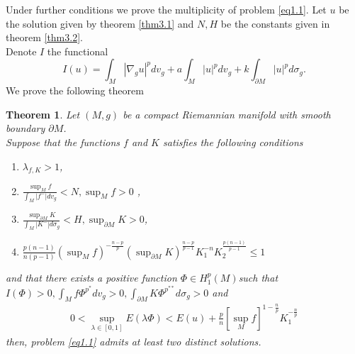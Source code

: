 \documentclass{Tran-l}
\newtheorem{thm}{Theorem}[section]
\theoremstyle{definition}
\theoremstyle{remark}
\numberwithin{equation}{section}
\begin{document}
Under further conditions we prove the multiplicity of problem
\eqref{eq1.1}. Let $u$ be the solution given by theorem \ref{thm3.1}
and $N,H$ be the constants given in theorem \ref{thm3.2}.\\
Denote $I$ the functional
\begin{equation*}
    I(u)=\int_M|\nabla_gu|^{p}dv_g+a\int_M|u|^pdv_g+k\int_{\partial
M}|u|^pd\sigma_g.
\end{equation*} We prove
the following theorem
\begin{thm}\label{thm3.3}
Let $(M,g)$ be a compact Riemannian manifold with smooth boundary
$\partial M$.\\ Suppose that the functions $f$ and $K$ satisfies the
following conditions
\begin{enumerate}
\item $\lambda_{f,K}>1$,
\item $\frac{\sup_Mf}{\int_{M}|f^-|dv_g}<N,\sup_Mf>0$ ,
\item $\frac{\sup_{\partial
 M}K}{\int_{M}|K^-|d\sigma_g}<H, \sup_{\partial M}K>0$,
\item $\frac{p(n-1)}{n(p-1)}(\sup_Mf)^{-\frac{n-p}{p}}(\sup_{\partial
M}K)^\frac{n-p}{p-1}K_1^{-n}K_2^{\frac{p(n-1)}{p-1}}\le1 $
\end{enumerate}
and that there exists  a positive function $\Phi\in H^p_1(M)$such
that $I(\Phi)>0, \int_Mf\Phi^{p^*}dv_g>0, \int_{\partial
M}K\Phi^{p^{**}}d\sigma_g>0$ and
\begin{eqnarray*}
  0<\underset{\lambda\in[0,1]}\sup E(\lambda\Phi)<
E(u)+\frac{p}{n}\left[\sup_Mf\right]^{1-\frac{n}{p}}K_1^{-\frac{n}{p}}
\end{eqnarray*}
then, problem \eqref{eq1.1} admits at least two distinct solutions.
\end{thm}
\end{document}
